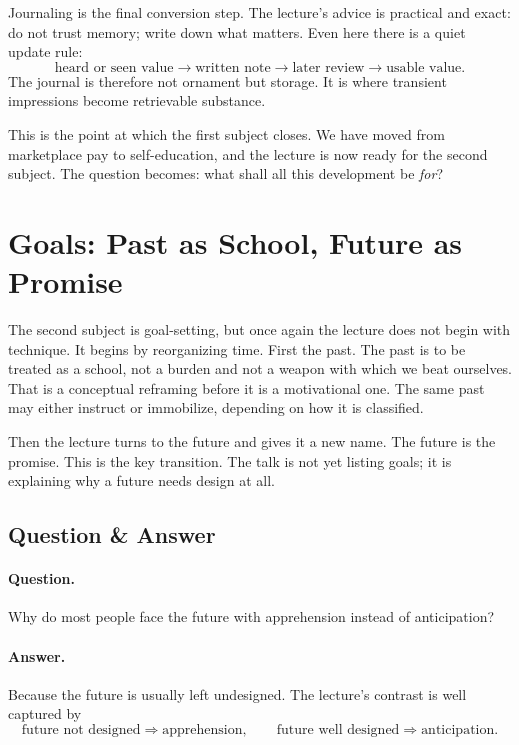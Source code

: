Journaling is the final conversion step. The lecture's advice is practical and exact: do not trust memory; write down what matters. Even here there is a quiet update rule:
\begin{equation}
\text{heard or seen value} \longrightarrow \text{written note} \longrightarrow \text{later review} \longrightarrow \text{usable value}.
\end{equation}
The journal is therefore not ornament but storage. It is where transient impressions become retrievable substance.

This is the point at which the first subject closes. We have moved from marketplace pay to self-education, and the lecture is now ready for the second subject. The question becomes: what shall all this development be \emph{for}?

\section{Goals: Past as School, Future as Promise}

The second subject is goal-setting, but once again the lecture does not begin with technique. It begins by reorganizing time. First the past. The past is to be treated as a school, not a burden and not a weapon with which we beat ourselves. That is a conceptual reframing before it is a motivational one. The same past may either instruct or immobilize, depending on how it is classified.

Then the lecture turns to the future and gives it a new name. The future is the promise. This is the key transition. The talk is not yet listing goals; it is explaining why a future needs design at all.

\subsection{Question \& Answer}

\paragraph{Question.} Why do most people face the future with apprehension instead of anticipation?

\paragraph{Answer.} Because the future is usually left undesigned. The lecture's contrast is well captured by
\begin{equation}
\text{future not designed} \Rightarrow \text{apprehension}, \qquad
\text{future well designed} \Rightarrow \text{anticipation}.
\end{equation}

